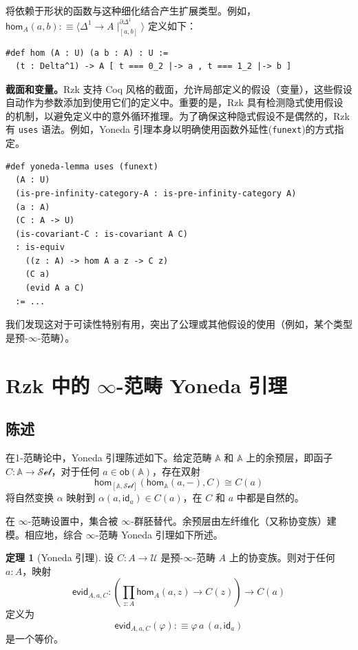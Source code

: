 \documentclass[12pt,a4paper]{article}
\theoremstyle{definition}
\newtheorem{theorem}{定理}[section]
\theoremstyle{definition}
\begin{document}
将依赖于形状的函数与这种细化结合产生扩展类型。例如，$\mathsf{hom}_A(a,b) :\equiv \langle \Delta^1 \to A \mid_{[a,b]}^{\partial\Delta^1} \rangle$ 定义如下：
\begin{verbatim}
#def hom (A : U) (a b : A) : U := 
  (t : Delta^1) -> A [ t === 0_2 |-> a , t === 1_2 |-> b ]
\end{verbatim}

\textbf{截面和变量。}Rzk 支持 Coq 风格的截面，允许局部定义的假设（变量），这些假设自动作为参数添加到使用它们的定义中。重要的是，Rzk 具有检测隐式使用假设的机制，以避免定义中的意外循环推理。为了确保这种隐式假设不是偶然的，Rzk 有 \texttt{uses} 语法。例如，Yoneda 引理本身以明确使用函数外延性(\texttt{funext})的方式指定。

\begin{verbatim}
#def yoneda-lemma uses (funext)
  (A : U)
  (is-pre-infinity-category-A : is-pre-infinity-category A)
  (a : A)
  (C : A -> U)
  (is-covariant-C : is-covariant A C)
  : is-equiv
    ((z : A) -> hom A a z -> C z)
    (C a)
    (evid A a C)
  := ...
\end{verbatim}

我们发现这对于可读性特别有用，突出了公理或其他假设的使用（例如，某个类型是预-$\infty$-范畴）。

\section{Rzk 中的 $\infty$-范畴 Yoneda 引理}

\subsection{陈述}

在1-范畴论中，Yoneda 引理陈述如下。给定范畴 $\mathbb{A}$ 和 $\mathbb{A}$ 上的余预层，即函子 $C:\mathbb{A} \to \mathcal{Set}$，对于任何 $a \in \mathsf{ob}(\mathbb{A})$，存在双射
\[
\mathsf{hom}_{[\mathbb{A},\mathcal{Set}]}\left(\mathsf{hom}_{\mathbb{A}}(a,-), C\right) \cong C(a)
\]
将自然变换 $\alpha$ 映射到 $\alpha(a, \mathsf{id}_a) \in C(a)$，在 $C$ 和 $a$ 中都是自然的。

在 $\infty$-范畴设置中，集合被 $\infty$-群胚替代。余预层由左纤维化（又称协变族）建模。相应地，综合 $\infty$-范畴 Yoneda 引理如下所述。

\begin{theorem}[Yoneda 引理]
设 $C:A \to \mathcal{U}$ 是预-$\infty$-范畴 $A$ 上的协变族。则对于任何 $a:A$，映射
\[
\mathsf{evid}_{A,a,C} : \left(\prod_{z:A} \mathsf{hom}_A(a,z) \to C(z)\right) \to C(a)
\]
定义为
\[
\mathsf{evid}_{A,a,C}(\varphi) :\equiv \varphi\,a\,(a, \mathsf{id}_a)
\]
是一个等价。
\end{theorem}
\end{document}
